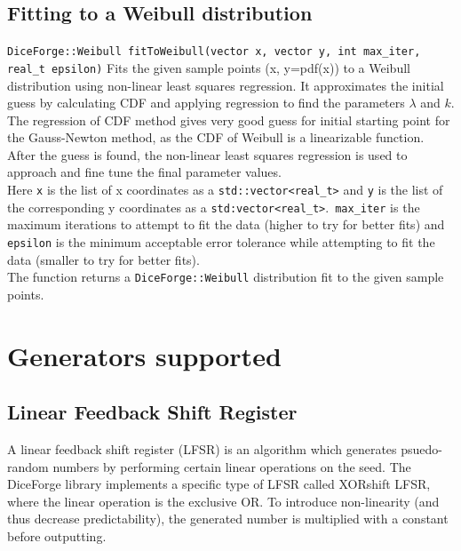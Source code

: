 \documentclass[titlepage, 11pt]{article}
\newcommand{\code}[1]
{\colorbox{light-gray}{\texttt{#1}}}
\begin{document}
\subsection{Fitting to a Weibull distribution}
\code{DiceForge::Weibull fitToWeibull(vector x, vector y, int max\_iter,}
\newline
\code{real\_t epsilon)}
\newline 
\newline
Fits the given sample points (x, y=pdf(x)) to a Weibull distribution using non-linear least squares regression.
\newline It approximates the initial guess by calculating CDF and applying regression to find the parameters $\lambda$ and $k$. The regression of CDF method gives very good guess for initial starting point for the Gauss-Newton method, as the CDF of Weibull is a linearizable function. After the guess is found, the non-linear least squares regression is used to approach and fine tune the final parameter values.
\newline\\
Here \code{x} is the list of x coordinates as a \code{std::vector<real\_t>} and \code{y} is the list of the corresponding y coordinates as a \code{std:vector<real\_t>}.\
\code{max\_iter} is the maximum iterations to attempt to fit the data (higher to try for better fits) and \code{epsilon} is the minimum acceptable error tolerance while attempting to fit the data (smaller to try for better fits).\\
\newline
The function returns a \code{DiceForge::Weibull} distribution fit to the given sample points.

\newpage
\section {Generators supported}
\subsection{Linear Feedback Shift Register}
A linear feedback shift register (LFSR) is an algorithm which generates psuedo-random numbers by performing certain linear operations on the seed. The DiceForge library implements a specific type of LFSR called XORshift LFSR, where the linear operation is the exclusive OR. To introduce non-linearity (and thus decrease predictability), the generated number is multiplied with a constant before outputting.
\end{document}
